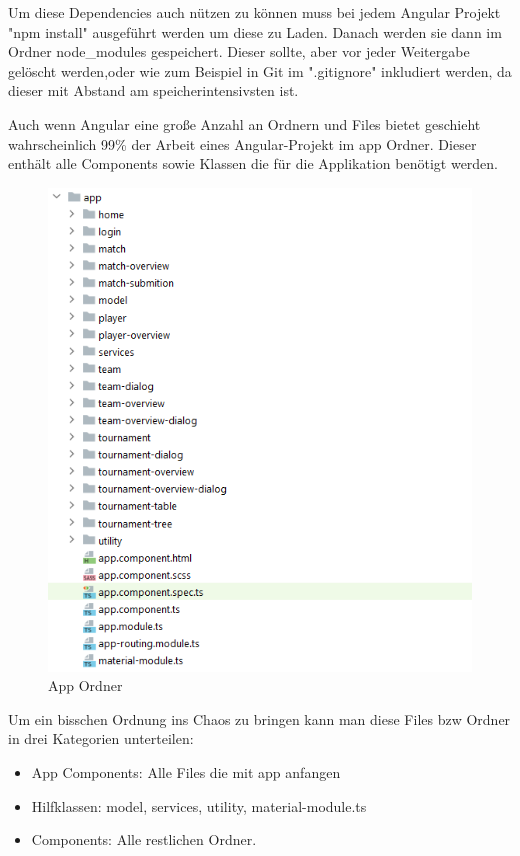 Um diese Dependencies auch nützen zu können muss bei jedem Angular Projekt "npm install" ausgeführt werden um diese zu Laden.
Danach werden sie dann im Ordner node\_modules gespeichert.
Dieser sollte, aber vor jeder Weitergabe gelöscht werden,oder wie zum Beispiel in Git im ".gitignore" inkludiert werden, da dieser mit Abstand am speicherintensivsten ist. 

\newpage
Auch wenn Angular eine große Anzahl an Ordnern und Files bietet geschieht wahrscheinlich 99\% der Arbeit eines Angular-Projekt im app Ordner.
Dieser enthält alle Components sowie Klassen die für die Applikation benötigt werden.

\begin{figure}[H]
    \includegraphics[scale=0.6]{pics/frontend/app_folder.PNG}
    \caption{App Ordner}
\end{figure}

Um ein bisschen Ordnung ins Chaos zu bringen kann man diese Files bzw Ordner in drei Kategorien unterteilen:
\begin{itemize}
    \item App Components: Alle Files die mit app anfangen
    \item Hilfklassen: model, services, utility, material-module.ts
    \item Components: Alle restlichen Ordner.
\end{itemize}

